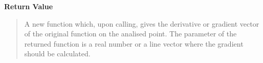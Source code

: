 \begin{boxedminipage}{\funcwidth}
\begin{quote}
      \end{quote}

      \textbf{Return Value}
    \vspace{-1ex}

      \begin{quote}

A new function which, upon calling, gives the derivative or gradient
vector of the original function on the analised point. The parameter of
the returned function is a real number or a line vector where the gradient
should be calculated.
      \end{quote}

    \end{boxedminipage}

    \label{peach:optm:base:hessian}

    \vspace{0.5ex}

